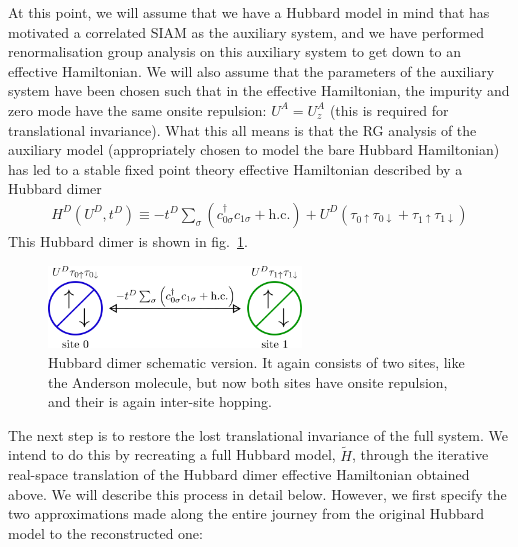 \documentclass[12pt]{article}
\numberwithin{equation}{section}
\begin{document}
At this point, we will assume that we have a Hubbard model in mind that has motivated a correlated SIAM as the auxiliary system, and we have performed renormalisation group analysis on this auxiliary system to get down to an effective Hamiltonian. We will also assume that the parameters of the auxiliary system have been chosen such that in the effective Hamiltonian, the impurity and zero mode have the same onsite repulsion: $U^A = U^A_z$ (this is required for translational invariance). What this all means is that the RG analysis of the auxiliary model (appropriately chosen to model the bare Hubbard Hamiltonian) has led to a stable fixed point theory effective Hamiltonian described by a Hubbard dimer 
\begin{equation}\begin{aligned}
	H^D(U^D, t^D) \equiv -t^D\sum_\sigma\left( c^\dagger_{0\sigma}c_{1\sigma} + \text{h.c.} \right) + U^D\left( \tau_{0 \uparrow}\tau_{0 \downarrow} + \tau_{1 \uparrow}\tau_{1 \downarrow}\right)
\end{aligned}\end{equation}
This Hubbard dimer is shown in fig.~\ref{hubb-dim}.
\begin{figure}[htpb!]
	\centering
	\includegraphics[width=0.6\textwidth]{./hubb_dim.png}
	\caption{Hubbard dimer schematic version. It again consists of two sites, like the Anderson molecule, but now both sites have onsite repulsion, and their is again inter-site hopping.}
	\label{hubb-dim}
\end{figure}
\par\noindent
The next step is to restore the lost translational invariance of the full system. We intend to do this by recreating a full Hubbard model, $\tilde H$, through the iterative real-space translation of the Hubbard dimer effective Hamiltonian obtained above. We will describe this process in detail below. However, we first specify the two approximations made along the entire journey from the original Hubbard model to the reconstructed one:
\end{document}
